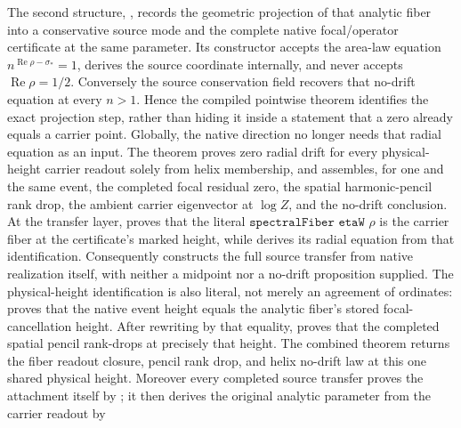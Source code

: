 \documentclass[11pt]{article}
\theoremstyle{definition}
\renewcommand{\Re}{\operatorname{Re}}
\begin{document}
The second structure, , records the
geometric projection of that analytic fiber into a conservative source mode
and the complete native focal/operator certificate at the same parameter.  Its
constructor
 accepts the
area-law equation \(n^{\Re\rho-\sigma_*}=1\), derives the source coordinate
internally, and never accepts \(\Re\rho=1/2\).  Conversely the source
conservation field recovers that no-drift equation at every \(n>1\).  Hence the
compiled pointwise theorem
identifies the exact projection step, rather than hiding it inside a statement
that a zero already equals a carrier point.  Globally,
the native direction no longer needs that radial equation as an input.
The theorem  proves zero radial drift
for every physical-height carrier readout solely from helix membership, and
assembles, for one and the same event, the completed focal residual zero, the
spatial harmonic-pencil rank drop, the ambient carrier eigenvector at
\(\log Z\), and the no-drift conclusion.  At the transfer layer,
proves that the literal \(\texttt{spectralFiber etaW }\rho\) is the carrier
fiber at the certificate's marked height, while
 derives its radial
equation from that identification.  Consequently
 constructs the
full source transfer from native realization itself, with neither a midpoint
nor a no-drift proposition supplied.  The physical-height identification is
also literal, not merely an agreement of ordinates:
proves that the native event height equals the analytic fiber's stored
focal-cancellation height.  After rewriting by that equality,
 proves that the completed
spatial pencil rank-drops at precisely that height.  The combined theorem
 returns the fiber
readout closure, pencil rank drop, and helix no-drift law at this one shared
physical height.
Moreover every completed source transfer proves the attachment itself by
; it then derives
the original analytic parameter from the carrier readout by
\end{document}
